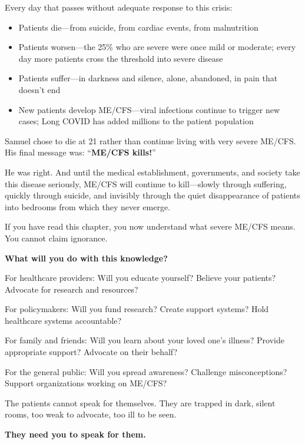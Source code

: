 Every day that passes without adequate response to this crisis:
\begin{itemize}
    \item Patients die---from suicide, from cardiac events, from malnutrition
    \item Patients worsen---the 25\% who are severe were once mild or moderate; every day more patients cross the threshold into severe disease
    \item Patients suffer---in darkness and silence, alone, abandoned, in pain that doesn't end
    \item New patients develop ME/CFS---viral infections continue to trigger new cases; Long COVID has added millions to the patient population
\end{itemize}

Samuel chose to die at 21 rather than continue living with very severe ME/CFS. His final message was: ``\textbf{ME/CFS kills!}''

He was right. And until the medical establishment, governments, and society take this disease seriously, ME/CFS will continue to kill---slowly through suffering, quickly through suicide, and invisibly through the quiet disappearance of patients into bedrooms from which they never emerge.

\begin{tcolorbox}[colback=red!5!white,colframe=red!75!black,title=Final Message]
If you have read this chapter, you now understand what severe ME/CFS means. You cannot claim ignorance.

\textbf{What will you do with this knowledge?}

For healthcare providers: Will you educate yourself? Believe your patients? Advocate for research and resources?

For policymakers: Will you fund research? Create support systems? Hold healthcare systems accountable?

For family and friends: Will you learn about your loved one's illness? Provide appropriate support? Advocate on their behalf?

For the general public: Will you spread awareness? Challenge misconceptions? Support organizations working on ME/CFS?

The patients cannot speak for themselves. They are trapped in dark, silent rooms, too weak to advocate, too ill to be seen.

\textbf{They need you to speak for them.}
\end{tcolorbox}

